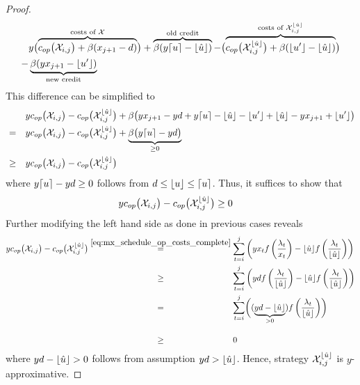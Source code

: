 \begin{proof}
\begin{align*}
	&y\bigl(\overbrace{c_{op}\bigl(\mathcal{X}_{i,j}\bigr)+\beta(x_{j+1}-d)}^{\text{costs of }\mathcal{X}}\bigr)+\overbrace{\beta(y\lceil u\rceil-\lfloor\hat{u}\rfloor)}^{\text{old credit}}-\bigl(\overbrace{c_{op}\bigl(\mathcal{X}_{i,j}^{\lfloor\hat{u}\rfloor}\bigr)+\beta(\lfloor u'\rfloor-\lfloor\hat{u}\rfloor)}^{\text{costs of }\mathcal{X}_{i,j}^{\lfloor\hat{u}\rfloor}}\bigr)\\
	-&\underbrace{\beta(yx_{j+1}-\lfloor u'\rfloor)}_{\text{new credit}}
\end{align*}
This difference can be simplified to
\begin{align*}
	&&&yc_{op}\bigl(\mathcal{X}_{i,j}\bigr)-c_{op}\bigl(\mathcal{X}_{i,j}^{\lfloor\hat{u}\rfloor}\bigr)+\beta\bigl(yx_{j+1}-yd+y\lceil u\rceil-\lfloor\hat{u}\rfloor-\lfloor u'\rfloor+\lfloor\hat{u}\rfloor-yx_{j+1}+\lfloor u'\rfloor\bigr)\\
	&=&&yc_{op}\bigl(\mathcal{X}_{i,j}\bigr)-c_{op}\bigl(\mathcal{X}_{i,j}^{\lfloor\hat{u}\rfloor}\bigr)+\underbrace{\beta\bigl(y\lceil u\rceil-yd\bigr)}_{\ge 0}\\
	&\ge&&yc_{op}\bigl(\mathcal{X}_{i,j}\bigr)-c_{op}\bigl(\mathcal{X}_{i,j}^{\lfloor\hat{u}\rfloor}\bigr)
\end{align*}
where $y\lceil u\rceil-yd\ge 0$ follows from $d\le \lfloor u\rfloor\le \lceil u\rceil$. Thus, it suffices to show that
\begin{align}
	yc_{op}\bigl(\mathcal{X}_{i,j}\bigr)-c_{op}\bigl(\mathcal{X}_{i,j}^{\lfloor\hat{u}\rfloor}\bigr)&\ge 0\label{eq:op_cost_floor_u_hat_y_approx}
\end{align}
Further modifying the left hand side as done in previous cases reveals
\begin{align*}
	y\opcosts\bigl(\mx_{i,j}\bigr)-\opcosts\bigl(\mx_{i,j}^{\floor{\hat{u}}}\bigr)&\stackrel{\eqref{eq:mx_schedule_op_costs_complete}}{=}\sum\limits_{t=i}^{j}\left(yx_tf\left(\frac{\lambda_t}{x_t}\right)-\floor{\hat{u}}f\left(\frac{\lambda_t}{\floor{\hat{u}}}\right)\right)\\
	&\stackrel{\phantom{\eqref{eq:mx_schedule_op_costs_complete}}}{\ge}\sum\limits_{t=i}^{j}\left(yd\*f\left(\frac{\lambda_t}{\floor{\hat{u}}}\right)-\floor{\hat{u}}f\left(\frac{\lambda_t}{\floor{\hat{u}}}\right)\right)\\
	&\stackrel{\phantom{\eqref{eq:mx_schedule_op_costs_complete}}}{=}\sum\limits_{t=i}^{j}\biggl((\underbrace{yd-\floor{\hat{u}}}_{>0})f\left(\frac{\lambda_t}{\floor{\hat{u}}}\right)\biggr)\\
	&\stackrel{\phantom{\eqref{eq:mx_schedule_op_costs_complete}}}{\ge}0
\end{align*}
where $yd-\lfloor\hat{u}\rfloor>0$ follows from assumption $yd>\lfloor\hat{u}\rfloor$. Hence, strategy $\mathcal{X}_{i,j}^{\lfloor\hat{u}\rfloor}$ is $y$-approxi\-mative.


\end{proof}
